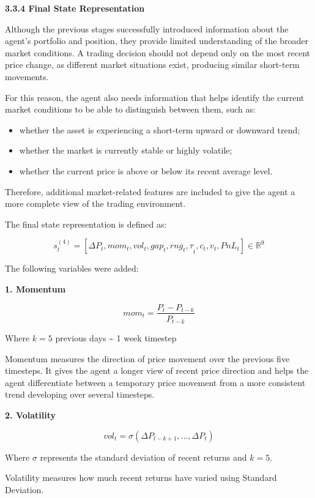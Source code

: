 \textbf{3.3.4 Final State Representation}

Although the previous stages successfully introduced information about
the agent's portfolio and position, they provide limited understanding
of the broader market conditions. A trading decision should not depend
only on the most recent price change, as different market situations
exist, producing similar short-term movements.

For this reason, the agent also needs information that helps identify
the current market conditions to be able to distinguish between them,
such as:

\begin{itemize}
\item
  whether the asset is experiencing a short-term upward or downward
  trend;
\item
  whether the market is currently stable or highly volatile;
\item
  whether the current price is above or below its recent average level.
\end{itemize}

Therefore, additional market-related features are included to give the
agent a more complete view of the trading environment.

The final state representation is defined as:

\[\boxed{s_{t}^{(4)} = \left\lbrack \Delta P_{t},mom_{t},vol_{t},gap_{t},{rng_{t},\tau}_{t},c_{t},v_{t},PnL_{t} \right\rbrack \in \mathbb{R}^{9}}\]

The following variables were added:

\textbf{1. Momentum}

\[mom_{t} = \frac{P_{t} - P_{t - k}}{P_{t - k}}\]

Where \(k = 5\) previous days \textasciitilde{} 1 week timestep

Momentum measures the direction of price movement over the previous five
timesteps. It gives the agent a longer view of recent price direction
and helps the agent differentiate between a temporary price movement
from a more consistent trend developing over several timesteps.

\textbf{2. Volatility}

\[vol_{t} = \sigma\left( \Delta P_{t - k + 1},...,\Delta P_{t} \right)\]

Where \(\sigma\) represents the standard deviation of recent returns and
\(k = 5\).

Volatility measures how much recent returns have varied using Standard
Deviation.

